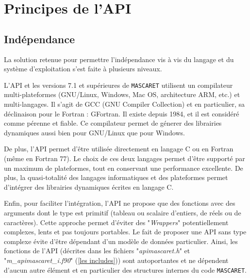 \documentclass[a4paper,11pt]{article}
\begin{document}
\section{Principes de l'API}

\subsection{Ind\'ependance}

 La solution retenue pour permettre l'ind\'ependance vis \`a vis du langage et du syst\`eme d'exploitation s'est faite \`a plusieurs niveaux.
 
 \vspace{0.5cm}
 
 L'API et les versions 7.1 et sup\'erieures de \texttt{MASCARET} utilisent un compilateur multi-plateformes (GNU/Linux, Windows, Mac OS, architecture ARM, etc.) et multi-langages.
 Il s'agit de GCC (GNU Compiler Collection) et en particulier, sa d\'eclinaison pour le Fortran : GFortran. Il existe depuis 1984, et il est consid\'er\'e comme p\'erenne et fiable.
 Ce compilateur permet de g\'enerer des librairies dynamiques aussi bien pour GNU/Linux que pour Windows.
 
 \vspace{0.5cm}
 
 De plus, l'API permet d'\^etre utilis\'ee directement en langage C ou en Fortran (m\^eme en Fortran 77). Le choix de ces deux langages permet d'\^etre support\'e par un maximum de plateformes, tout en conservant une performance excellente. De plus, la quasi-totalit\'e des langages informatiques et des plateformes permet d'int\'egrer des librairies dynamiques \'ecrites en langage C.
 
 \vspace{0.5cm}
 
 Enfin, pour faciliter l'int\'egration, l'API ne propose que des fonctions avec des arguments dont le type est primitif (tableau ou scalaire d'entiers, de r\'eels ou de caract\`eres). Cette approche permet d'\'eviter des "\textit{Wrappers}" potentiellement complexes, lents et pas toujours portables. Le fait de proposer une API sans type complexe \'evite d'\^etre d\'ependant d'un mod\`ele de donn\'ees particulier. Ainsi, les fonctions de l'API (d\'ecrites dans les fichiers "\textit{apimascaret.h}" et "\textit{m\_apimascaret\_i.f90}" (\ref{les includes})) sont autoportantes et ne d\'ependent d'aucun autre \'el\'ement et en particulier des structures internes du code \texttt{MASCARET}.
\end{document}
